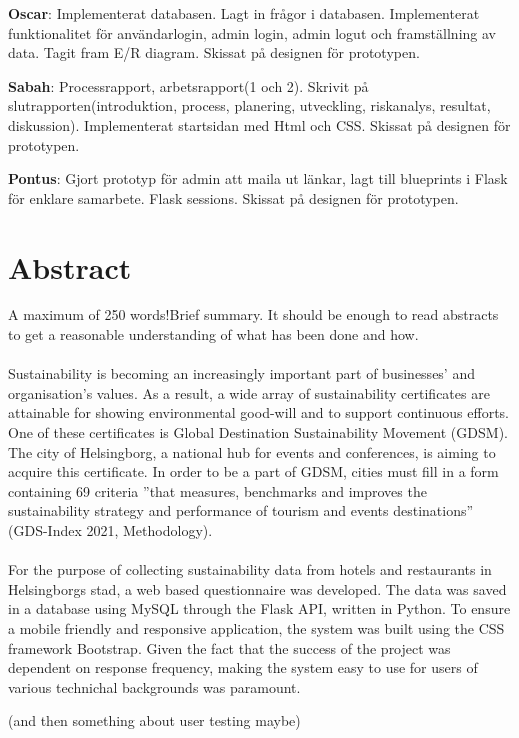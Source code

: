 \documentclass[12pt]{article}
\begin{document}
\textbf{Oscar}: Implementerat databasen. Lagt in frågor i databasen. Implementerat funktionalitet för användarlogin, admin login, admin logut och framställning av data. Tagit fram E/R diagram. Skissat på designen för prototypen.

\textbf{Sabah}: Processrapport, arbetsrapport(1 och 2). Skrivit på slutrapporten(introduktion, process, planering, utveckling, riskanalys, resultat, diskussion). Implementerat startsidan med Html och CSS. Skissat på designen för prototypen.  

\textbf{Pontus}: Gjort prototyp för admin att maila ut länkar, lagt till blueprints i Flask för enklare samarbete. Flask sessions. Skissat på designen för prototypen.

\newpage
\section{Abstract}
A maximum of 250 words!Brief summary. It should be enough to read abstracts to get a reasonable understanding of what has been done and how.
\\\\
Sustainability is becoming an increasingly important part of businesses’ and organisation’s values. As a result, a wide array of sustainability certificates are attainable for showing environmental good-will and to support continuous efforts. One of these certificates is Global Destination Sustainability Movement (GDSM). The city of Helsingborg, a national hub for events and conferences, is aiming to acquire this certificate. In order to be a part of GDSM, cities must fill in a form containing 69 criteria ”that measures, benchmarks and improves the sustainability strategy and performance of tourism and events destinations” (GDS-Index 2021, Methodology).\\\\
For the purpose of collecting sustainability data from hotels and restaurants in Helsingborgs stad, a web based questionnaire was developed. The data was saved in a database using MySQL through the Flask API, written in Python. To ensure a mobile friendly and responsive application, the system was built using the CSS framework Bootstrap. 
Given the fact that the success of the project was dependent on response frequency, making the system easy to use for users of various technichal backgrounds was paramount. 

(and then something about user testing maybe)

\newpage
\end{document}
